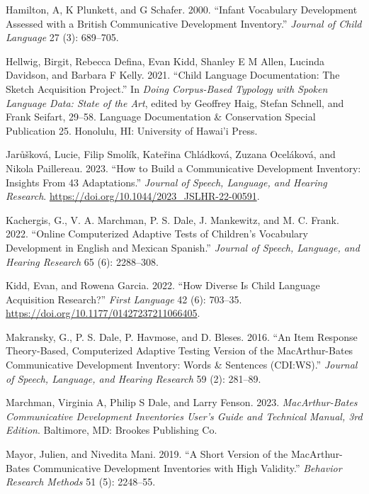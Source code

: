 \documentclass[
  letterpaper,
  DIV=11,
  numbers=noendperiod]{scrartcl}
\newlength{\cslhangindent}
\newenvironment{CSLReferences}[2] %
 {\begin{list}{}{%
  \setlength{\itemindent}{0pt}
  \setlength{\leftmargin}{0pt}
  \setlength{\parsep}{0pt}
  \ifodd #1
   \setlength{\leftmargin}{\cslhangindent}
   \setlength{\itemindent}{-1\cslhangindent}
  \fi
  \setlength{\itemsep}{#2\baselineskip}}}
 {\end{list}}
\begin{document}
\begin{CSLReferences}{1}{0}
Hamilton, A, K Plunkett, and G Schafer. 2000. {``Infant Vocabulary
Development Assessed with a British Communicative Development
Inventory.''} \emph{Journal of Child Language} 27 (3): 689--705.

Hellwig, Birgit, Rebecca Defina, Evan Kidd, Shanley E M Allen, Lucinda
Davidson, and Barbara F Kelly. 2021. {``Child Language Documentation:
{The} Sketch Acquisition Project.''} In \emph{Doing Corpus-Based
Typology with Spoken Language Data: {State} of the Art}, edited by
Geoffrey Haig, Stefan Schnell, and Frank Seifart, 29--58. Language
{Documentation} \& {Conservation Special Publication} 25. Honolulu, HI:
University of Hawai'i Press.

Jarůšková, Lucie, Filip Smolík, Kateřina Chládková, Zuzana Oceláková,
and Nikola Paillereau. 2023. {``How to {Build} a {Communicative
Development Inventory}: {Insights From} 43 {Adaptations}.''}
\emph{Journal of Speech, Language, and Hearing Research}.
\url{https://doi.org/10.1044/2023_JSLHR-22-00591}.

Kachergis, G., V. A. Marchman, P. S. Dale, J. Mankewitz, and M. C.
Frank. 2022. {``Online Computerized Adaptive Tests of Children's
Vocabulary Development in {English} and {Mexican Spanish}.''}
\emph{Journal of Speech, Language, and Hearing Research} 65 (6):
2288--308.

Kidd, Evan, and Rowena Garcia. 2022. {``How Diverse Is Child Language
Acquisition Research?''} \emph{First Language} 42 (6): 703--35.
\url{https://doi.org/10.1177/01427237211066405}.

Makransky, G., P. S. Dale, P. Havmose, and D. Bleses. 2016. {``An Item
Response Theory-Based, Computerized Adaptive Testing Version of the
{M}ac{A}rthur-{B}ates {C}ommunicative {D}evelopment {I}nventory: {W}ords
\& {S}entences ({CDI:WS}).''} \emph{Journal of Speech, Language, and
Hearing Research} 59 (2): 281--89.

Marchman, Virginia A, Philip S Dale, and Larry Fenson. 2023.
\emph{MacArthur-Bates Communicative Development Inventories User's Guide
and Technical Manual, 3rd Edition}. Baltimore, MD: Brookes Publishing
Co.

Mayor, Julien, and Nivedita Mani. 2019. {``A Short Version of the
{M}ac{A}rthur-{B}ates {C}ommunicative {D}evelopment {I}nventories with
High Validity.''} \emph{Behavior Research Methods} 51 (5): 2248--55.


\end{CSLReferences}
\end{document}
